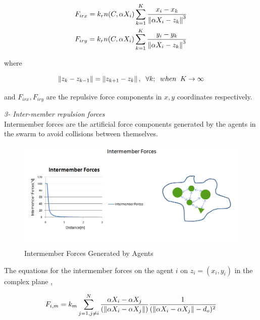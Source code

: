 \begin{align}
\begin{split}
& F_{irx} = k_r n(C,\alpha X_i)  \sum_{k=1}^{K} \frac{x_i - x_k}{\left\lVert\alpha X_i - z_k\right\rVert^3}\\
& F_{iry} = k_r n(C,\alpha X_i)  \sum_{k=1}^{K} \frac{y_i - y_k}{\left\lVert\alpha X_i - z_k\right\rVert^3}
\end{split}
\end{align}
				
where

\begin{equation}
\left\lVert z_k - z_{k-1}\right\rVert = \left\lVert z_{k+1} - z_k\right\rVert, \hspace{0.2cm}  \forall k ;  \hspace{0.2cm} when  \hspace{0.2cm} K \to\infty
\end{equation}
						
and $F_{irx} , F_{iry} $ are the repulsive force components in $x,y$ coordinates respectively. \newline
						
\textit{		3- Inter-member repulsion forces} \\ 
Intermember forces are the artificial force components generated by the agents in the swarm to avoid collisions between themselves. 
			
\begin{figure}[H]
\caption{Intermember Forces Generated by Agents}
\centering
\includegraphics[scale = 0.60]{intermember_forces}
\end{figure}
			
The equations for the intermember forces on the agent $i$ on $z_i = (x_i, y_i)$  in the complex plane \cite{17},
			
\begin{equation}
F_{i,m} = k_m \sum_{j=1, j\neq i}^{N}\frac{\alpha X_i - \alpha X_j}{(\left\lVert\alpha X_i - \alpha X_j\right\rVert)} \frac{1}{(\left\lVert\alpha X_i - \alpha X_j\right\rVert - d_o)^2}
\end{equation}
			

